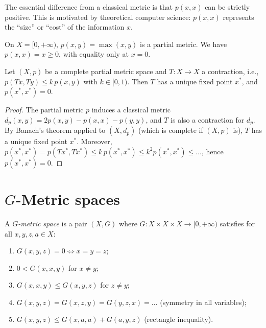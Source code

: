 \begin{remark}
The essential difference from a classical metric is that $p(x, x)$ can be
strictly positive. This is motivated by theoretical computer science: $p(x, x)$
represents the ``size'' or ``cost'' of the information $x$.
\end{remark}

\begin{example}
On $X = [0, +\infty)$, $p(x, y) = \max(x, y)$ is a partial metric. We have
$p(x, x) = x \geq 0$, with equality only at $x = 0$.
\end{example}

\begin{theorem}[Matthews, 1994]
Let $(X, p)$ be a complete partial metric space and $T : X \to X$ a contraction,
i.e., $p(Tx, Ty) \leq k \, p(x, y)$ with $k \in [0, 1)$. Then $T$ has a unique
fixed point $x^*$, and $p(x^*, x^*) = 0$.
\end{theorem}

\begin{proof}
The partial metric $p$ induces a classical metric
$d_p(x, y) = 2p(x, y) - p(x, x) - p(y, y)$, and $T$ is also a contraction for
$d_p$. By Banach's theorem applied to $(X, d_p)$ (which is complete if $(X, p)$
is), $T$ has a unique fixed point $x^*$. Moreover,
$p(x^*, x^*) = p(Tx^*, Tx^*) \leq k \, p(x^*, x^*) \leq k^2 p(x^*, x^*) \leq \ldots$,
hence $p(x^*, x^*) = 0$.
\end{proof}

\section{$G$-Metric spaces}

\begin{definition}
A \emph{$G$-metric space} is a pair $(X, G)$ where
$G : X \times X \times X \to [0, +\infty)$ satisfies for all $x, y, z, a \in X$:
\begin{enumerate}
    \item $G(x, y, z) = 0 \Leftrightarrow x = y = z$;
    \item $0 < G(x, x, y)$ for $x \neq y$;
    \item $G(x, x, y) \leq G(x, y, z)$ for $z \neq y$;
    \item $G(x, y, z) = G(x, z, y) = G(y, z, x) = \ldots$ (symmetry in all variables);
    \item $G(x, y, z) \leq G(x, a, a) + G(a, y, z)$ (rectangle inequality).
\end{enumerate}
\end{definition}

